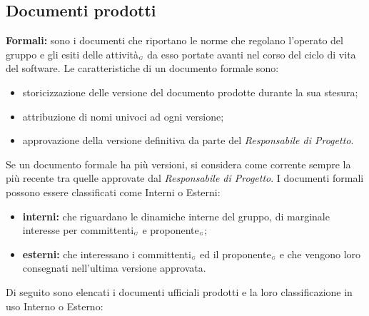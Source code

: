 \subsection{Documenti prodotti}\label{ProcessiDiSupportoDocumentazioneDocumentiProdotti}
	 \textbf{Formali:} sono i documenti che riportano le norme che regolano l’operato del gruppo e gli esiti delle attività$_{\scaleto{G}{3pt}}$ da esso portate avanti nel corso del ciclo di vita del software. Le caratteristiche di un documento formale sono:
\begin{itemize}
\item storicizzazione delle versione del documento prodotte durante la sua stesura;
	\item attribuzione di nomi univoci ad ogni versione;
		\item approvazione della versione definitiva da parte del \textit{Responsabile di Progetto}.
\end{itemize}
Se un documento formale ha più versioni, si considera come corrente sempre la più recente tra quelle approvate dal \textit{Responsabile di Progetto}. I documenti formali possono essere classificati come Interni o Esterni:
\begin{itemize}
\item \textbf {interni:} che riguardano le dinamiche interne del gruppo, di marginale interesse per committenti$_{\scaleto{G}{3pt}}$ e proponente$_{\scaleto{G}{3pt}}$;
	\item \textbf {esterni:}  che interessano i committenti$_{\scaleto{G}{3pt}}$ ed il proponente$_{\scaleto{G}{3pt}}$ e che vengono loro consegnati nell’ultima versione approvata.
\end{itemize}
Di seguito sono elencati i documenti ufficiali prodotti e la loro classificazione in uso Interno o Esterno:
